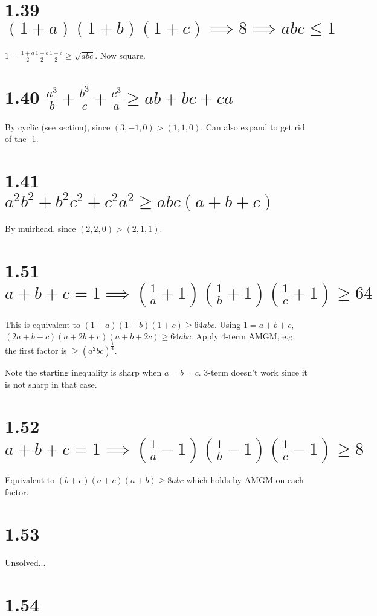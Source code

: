 \documentclass{article}
\begin{document}
\section*{1.39 $(1+a)(1+b)(1+c) \implies 8 \implies abc \le 1$}

$ 1 = \frac{1+a}{2} \frac{1+b}{2} \frac{1+c}{2} \ge \sqrt{abc}$. Now square.

\section*{1.40 $\frac{a^3}{b} + \frac{b^3}{c} + \frac{c^3}{a} \ge ab + bc + ca$}

By cyclic (see section), since $(3, -1, 0) > (1, 1, 0)$. Can also expand to get rid of the -1.

\section*{1.41 $a^2b^2 + b^2c^2 + c^2a^2 \ge abc(a+b+c)$}

By muirhead, since $(2, 2, 0) > (2, 1, 1)$.

\section*{1.51 $a + b + c = 1 \implies \left(\frac{1}{a}+1\right) \left(\frac{1}{b}+1\right) \left(\frac{1}{c}+1\right) \ge 64$}

This is equivalent to $(1+a)(1+b)(1+c) \ge 64abc$. Using $1 = a+b+c$, $(2a + b + c)(a + 2b + c)(a + b + 2c) \ge 64abc$. Apply 4-term AMGM, e.g. the first factor is $\ge (a^2bc)^\frac{1}{4}$.

Note the starting inequality is sharp when $a=b=c$. 3-term doesn't work since it is not sharp in that case.

\section*{1.52 $a + b + c = 1 \implies \left(\frac{1}{a}-1\right) \left(\frac{1}{b}-1\right) \left(\frac{1}{c}-1\right) \ge 8$}

Equivalent to $(b+c)(a+c)(a+b) \ge 8abc$ which holds by AMGM on each factor.

\section*{1.53}

Unsolved...

\section*{1.54}
\end{document}
